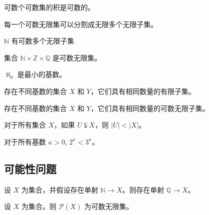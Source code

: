\begin{chapex} %
可数个可数集的积是可数的。
\end{chapex}

\begin{chapex} %
每一个可数无限集可以分割成无限多个无限子集。
\end{chapex}

\begin{chapex} %
$\mathbb{N}$ 有可数多个无限子集
\end{chapex}

\begin{chapex} %
集合 $\mathbb{N} \times \mathbb{Z} \times \mathbb{Q}$ 是可数无限集。
\end{chapex}

\begin{chapex} %
$\aleph_0$ 是最小的基数。
\end{chapex}

\begin{chapex} %
存在不同基数的集合 $X$ 和 $Y$，它们具有相同数量的有限子集。
\end{chapex}

\begin{chapex} %
存在不同基数的集合 $X$ 和 $Y$，它们具有相同数量的可数无限子集。
\end{chapex}

\begin{chapex} %
对于所有集合 $X$，如果 $U \subsetneqq X$，则 $|U| < |X|$。
\end{chapex}

\begin{chapex} %
\label{cqInfinityTFEnd}
对于所有基数 $\kappa > 0$, $2^{\kappa} < 3^{\kappa}$。
\end{chapex}

\subsection*{可能性问题}


\begin{chapex} %
\label{cqInfinityASNBegin}
设 $X$ 为集合，并假设存在单射 $\mathbb{N} \to X$。则存在单射 $\mathbb{Q} \to X$。
\end{chapex}

\begin{chapex} %
设 $X$ 为集合。则 $\mathcal{P}(X)$ 为可数无限集。
\end{chapex}

